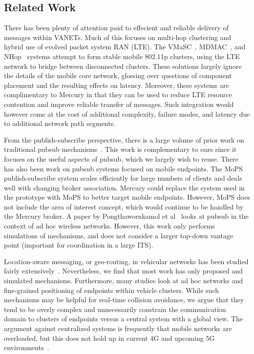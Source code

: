 \subsection{Related Work}

There has been plenty of attention paid to effecient and reliable
delivery of messages within VANETs.  Much of this focuses on multi-hop
clustering and hybrid use of evolved packet system RAN (LTE).  The
VMaSC~\cite{ucar2016multihop}, MDMAC~\cite{wolny2008modified}, and
NHop~\cite{zhang2011novel} systems attempt to form stable mobile
802.11p clusters, using the LTE network to bridge between disconnected
clusters. These solutions largely ignore the details of the mobile
core network, glossing over questions of component placement and the
resulting effects on latency. Moreover, these systems are
complimentary to Mercury in that they can be used to reduce LTE
resource contention and improve reliable transfer of messages. Such
integration would however come at the cost of additional complexity,
failure modes, and latency due to additional network path segments.

From the publish-subscribe perspective, there is a large volume of
prior work on traditional pubsub mechanisms~\cite{ps1,ps2,ps3,ps4}.
This work is complementary to ours since it focuses on the useful
aspects of pubsub, which we largely wish to reuse. There has also been
work on pubsub systems focused on mobile endpoints. The
MoPS~\cite{nasim2014mobile} publish-subscribe system scales
efficiently for large numbers of clients and deals well with changing
broker association.  Mercury could replace the \pubsub system used in
the prototype with MoPS to better target mobile endpoints. However,
MoPS does not include the area of interest concept, which would
continue to be handled by the Mercury broker. A paper by
Pongthawornkamol et al~\cite{pongthawornkamol2007analysis} looks at
pubsub in the context of ad hoc wireless networks. However, this work
only performs simulations of mechanisms, and does not consider a
larger top-down vantage point (important for coordination in a large
ITS).

Location-aware messaging, or geo-routing, in vehicular networks has
been studied fairly extensively~\cite{bilal2013position}.
Nevertheless, we find that most work has only proposed and simulated
mechanisms. Furthermore, many studies look at ad hoc networks and
fine-grained positioning of endpoints within vehicle clusters.  While
such mechanisms may be helpful for real-time collision avoidance, we
argue that they tend to be overly complex and unnecessarily constrain
the communication domain to clusters of endpoints versus a central
system with a global view. The argument against centralized systems is
frequently that mobile networks are overloaded, but this does not hold
up in current 4G and upcoming 5G environments~\cite{overload}.

